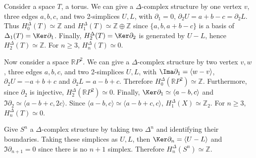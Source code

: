 \begin{exmp} Consider a space $T$, a torus. We can give a $\Delta$-complex structure by one vertex $v$, three edges $a,b,c$, and two 2-simplices $U,L$, with $\partial_1=0$, $\partial_2 U=a+b-c=\partial_2 L$. Thus $H_0^\Delta(T)\simeq \mathbb{Z}$ and $H_1^\Delta(T)\simeq \mathbb{Z}\oplus \mathbb{Z}$ since $\{a,b,a+b-c\}$ is a basis of $\Delta_1(T)=\Ker\partial_1$. Finally, $H_2^\Delta(T)=\Ker\partial_2$ is generated by $U-L$, hence $H_2^\Delta(T)\simeq \mathbb{Z}$. For $n\geq 3$, $H_n^\Delta(T)\simeq 0$.
\end{exmp}
\begin{exmp} Now consider a space $\mathbb{R}P^2$. We can give a $\Delta$-complex structure by two vertex $v,w$, three edges $a,b,c$, and two 2-simplices $U,L$, with $\Ima \partial_1=\langle w-v\rangle$, $\partial_2 U=-a+b+c$ and $\partial_2 L=a-b+c$. Therefore $H_0^\Delta (\mathbb{R}P^2)\simeq \mathbb{Z}$. Furthermore, since $\partial_2$ is injective, $H_2^\Delta(\mathbb{R}P^2)\simeq 0$. Finally, $\Ker \partial_1\simeq \langle a-b,c\rangle$ and $\Im\partial_2\simeq \langle a-b+c,2c\rangle$. Since $\langle a-b,c\rangle\simeq \langle a-b+c,c\rangle$, $H_1^\Delta(X)\simeq \mathbb{Z}_2$. For $n\geq 3$, $H_n^\Delta(T)\simeq 0$.
\end{exmp}
\begin{exmp} Give $S^n$ a $\Delta$-complex structure by taking two $\Delta^n$ and identifying their boundaries. Taking these simplices as $U,L$, then $\Ker\partial_n=\langle U-L\rangle$ and $\Im\partial_{n+1}=0$ since there is no $n+1$ simplex. Therefore $H_n^\Delta(S^n)\simeq \mathbb{Z}$.
\end{exmp}


